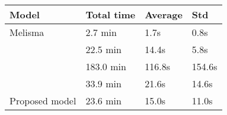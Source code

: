 \begin{tabular}{l|lll}
    Model                        & Total time & Average & Std    \\
    \hline
    Melisma                      & 2.7 min    & 1.7s    & 0.8s   \\
    \textcite{chen2021attend}    & 22.5 min   & 14.4s   & 5.8s   \\
    \textcite{mcleod2021modular} & 183.0 min  & 116.8s  & 154.6s \\
    \textcite{micchi2021deep}    & 33.9 min   & 21.6s   & 14.6s  \\
    Proposed model               & 23.6 min   & 15.0s   & 11.0s  \\
\end{tabular}
